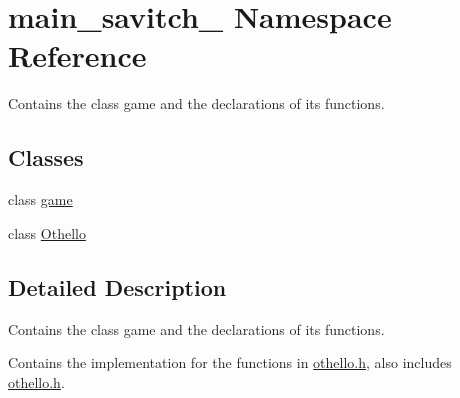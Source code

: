 \hypertarget{namespacemain__savitch__14}{}\section{main\+\_\+savitch\+\_ Namespace Reference}
\label{namespacemain__savitch__14}


Contains the class game and the declarations of its functions.  


\subsection*{Classes}
\begin{DoxyCompactItemize}
\item 
class \hyperlink{classmain__savitch__14_1_1game}{game}
\item 
class \hyperlink{classmain__savitch__14_1_1Othello}{Othello}
\end{DoxyCompactItemize}


\subsection{Detailed Description}
Contains the class game and the declarations of its functions. 

Contains the implementation for the functions in \hyperlink{othello_8h_source}{othello.\+h}, also includes \hyperlink{othello_8h_source}{othello.\+h}. 